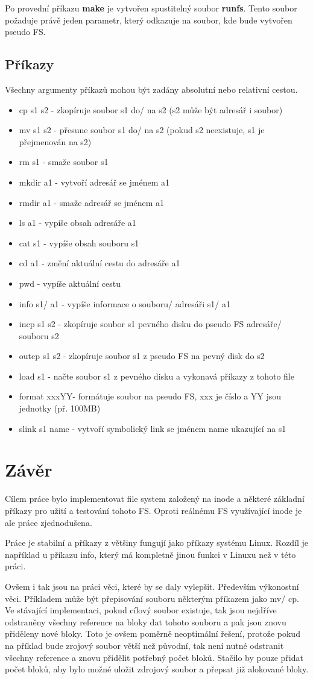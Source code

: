 \documentclass[12pt]{report}
\begin{document}
Po provední příkazu \textbf{make} je vytvořen spustitelný soubor \textbf{runfs}. Tento soubor 
požaduje právě jeden parametr, který odkazuje na soubor, kde bude vytvořen pseudo FS.
%
\section{Příkazy}
Všechny argumenty příkazů mohou být zadány absolutní nebo relativní cestou.
\begin{itemize}
	\item cp s1 s2 - zkopíruje soubor s1 do/ na s2 (s2 může být adresář i soubor)
	\item mv s1 s2 - přesune soubor s1 do/ na s2 (pokud s2 neexistuje, s1 je přejmenován na s2)
	\item rm s1 - smaže soubor s1
	\item mkdir a1 - vytvoří adresář se jménem a1
	\item rmdir a1 - smaže adresář se jménem a1
	\item ls a1 - vypíše obsah adresáře a1
	\item cat s1 - vypíše obsah souboru s1
	\item cd a1 - změní aktuální cestu do adresáře a1
	\item pwd - vypíše aktuální cestu
	\item info s1/ a1 - vypíše informace o souboru/ adresáři s1/ a1
	\item incp s1 s2 - zkopíruje soubor s1 pevného disku do pseudo FS adresáře/ souboru s2
	\item outcp s1 s2 - zkopíruje soubor s1 z pseudo FS na pevný disk do s2
	\item load s1 - načte soubor s1 z pevného disku a vykonavá příkazy z tohoto file
	\item format xxxYY- formátuje soubor na pseudo FS, xxx je číslo a YY jsou jednotky (př. 100MB)
	\item slink s1 name - vytvoří symbolický link se jménem name ukazující na s1
\end{itemize}

%
%
\chapter{Závěr}
Cílem práce bylo implementovat file system založený na inode a některé základní příkazy 
pro užití a testování tohoto FS. Oproti reálnému FS využívající inode je ale práce zjednodušena.

Práce je stabilní a příkazy z většiny fungují jako příkazy systému Linux. Rozdíl je například u příkazu
info, který má kompletně jinou funkci v Linuxu než v této práci.

Ovšem i tak jsou na práci věci, které by se daly vylepšit. Především výkonostní věci. Příkladem může
být přepisování souboru některým příkazem jako mv/ cp. Ve stávající implementaci, pokud cílový soubor
existuje, tak jsou nejdříve odstraněny všechny reference na bloky dat tohoto souboru a pak jsou znovu
přiděleny nové bloky. Toto je ovšem poměrně neoptimální řešení, protože pokud na příklad bude zrojový
soubor větší než původní, tak není nutné odstranit všechny reference a znovu přidělit potřebný počet 
bloků. Stačilo by pouze přidat počet bloků, aby bylo možné uložit zdrojový soubor a přepsat již
alokované bloky.
\end{document}
